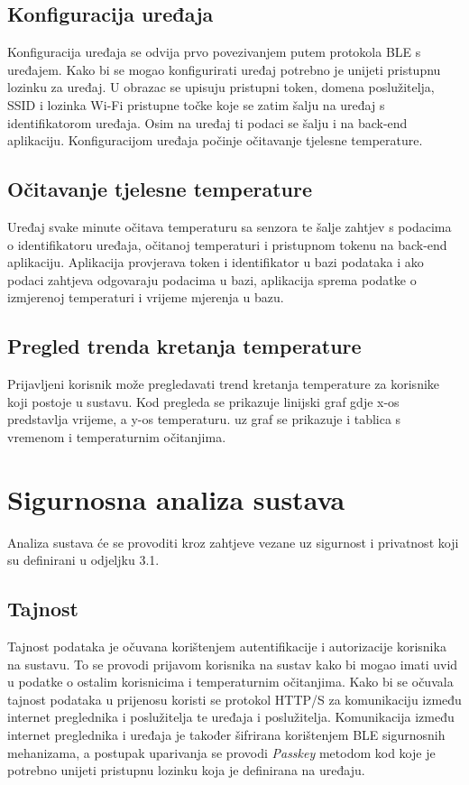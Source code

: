 \documentclass[times, utf8, diplomski]{fer}
\begin{document}
\subsection{Konfiguracija uređaja}
Konfiguracija uređaja se odvija prvo povezivanjem putem protokola BLE s uređajem. Kako bi se mogao konfigurirati uređaj potrebno je unijeti pristupnu lozinku za uređaj. U obrazac se upisuju pristupni token, domena poslužitelja, SSID i lozinka Wi-Fi pristupne točke koje se zatim šalju na uređaj s identifikatorom uređaja. Osim na uređaj ti podaci se šalju i na back-end aplikaciju. Konfiguracijom uređaja počinje očitavanje tjelesne temperature.

\subsection{Očitavanje tjelesne temperature}
Uređaj svake minute očitava temperaturu sa senzora te šalje zahtjev s podacima o identifikatoru uređaja, očitanoj temperaturi i pristupnom tokenu na back-end aplikaciju. Aplikacija provjerava token i identifikator u bazi podataka i ako podaci zahtjeva odgovaraju podacima u bazi, aplikacija sprema podatke o izmjerenoj temperaturi i vrijeme mjerenja u bazu.

\subsection{Pregled trenda kretanja temperature}
Prijavljeni korisnik može pregledavati trend kretanja temperature za korisnike koji postoje u sustavu. Kod pregleda se prikazuje linijski graf gdje x-os predstavlja vrijeme, a y-os temperaturu. uz graf se prikazuje i tablica s vremenom i temperaturnim očitanjima.

\section{Sigurnosna analiza sustava}
Analiza sustava će se provoditi kroz zahtjeve vezane uz sigurnost i privatnost koji su definirani u odjeljku 3.1.

\subsection{Tajnost}
Tajnost podataka je očuvana korištenjem autentifikacije i autorizacije korisnika na sustavu. To se provodi prijavom korisnika na sustav kako bi mogao imati uvid u podatke o ostalim korisnicima i temperaturnim očitanjima. Kako bi se očuvala tajnost podataka u prijenosu koristi se protokol HTTP/S za komunikaciju između internet preglednika i poslužitelja te uređaja i poslužitelja. Komunikacija između internet preglednika i uređaja je također šifrirana korištenjem BLE sigurnosnih mehanizama, a postupak uparivanja se provodi \emph{Passkey} metodom kod koje je potrebno unijeti pristupnu lozinku koja je definirana na uređaju.
\end{document}
